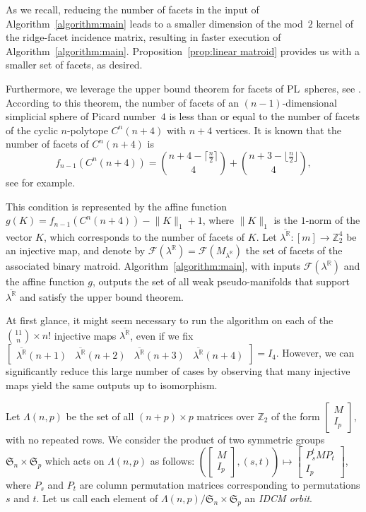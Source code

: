 \documentclass[11pt]{amsart}
\theoremstyle{plain}
\numberwithin{equation}{section}
\theoremstyle{definition}
\newcommand{\cF}{\mathcal{F}}
\newcommand{\R}{\mathbb{R}}
\newcommand{\Z}{\mathbb{Z}}
\begin{document}
As we recall, reducing the number of facets in the input of Algorithm~\ref{algorithm:main} leads to a smaller dimension of the mod~$2$ kernel of the ridge-facet incidence matrix, resulting in faster execution of Algorithm~\ref{algorithm:main}.
Proposition~\ref{prop:linear matroid} provides us with a smaller set of facets, as desired.

Furthermore, we leverage the upper bound theorem for facets of PL~spheres, see \cite{Stanley1996book}.
According to this theorem, the number of facets of an $(n-1)$-dimensional simplicial sphere of Picard number~$4$ is less than or equal to the number of facets of the cyclic $n$-polytope $C^n(n+4)$ with $n+4$ vertices.
It is known that the number of facets of $C^n(n+4)$ is
$$
    f_{n-1} (C^n(n+4)) = \binom{n+4- \lceil \frac{n}{2} \rceil}{4} + \binom{n+3- \lfloor \frac{n}{2} \rfloor}{4},
$$ see \cite{Buchstaber-Panov2015} for example.

This condition is represented by the affine function $g(K)=f_{n-1}(C^n(n+4))-\lVert K \rVert_1 +1$, where $\lVert K \rVert_1$ is the $1$-norm of the vector $K$, which corresponds to the number of facets of $K$.
Let $\overline{\lambda^\R} \colon [m] \longrightarrow \Z_2^4$ be an injective map, and denote by $\cF(\lambda^\R)=\cF(M_{\lambda^\R})$ the set of facets of the associated binary matroid.
Algorithm~\ref{algorithm:main}, with inputs $\cF(\lambda^\R)$ and the affine function $g$, outputs the set of all weak pseudo-manifolds that support $\overline{\lambda^\R}$ and satisfy the upper bound theorem.

At first glance, it might seem necessary to run the algorithm on each of the $\binom{11}{n}\times n!$ injective maps $\overline{\lambda^\R}$, even if we fix $\begin{bmatrix} \overline{\lambda^\R}(n+1) & \overline{\lambda^\R}(n+2) & \overline{\lambda^\R}(n+3) & \overline{\lambda^\R}(n+4) \end{bmatrix} = I_4$.
However, we can significantly reduce this large number of cases by observing that many injective maps yield the same outputs up to isomorphism.

Let $\Lambda(n, p)$ be the set of all $ (n+p) \times p$ matrices over $\Z_2$ of the form $\begin{bmatrix} M \\ I_p \end{bmatrix}$, with no repeated rows.
We consider the product of two symmetric groups $\mathfrak{S}_n \times \mathfrak{S}_p$
which acts on $\Lambda(n, p)$ as follows: $\left(\begin{bmatrix} M \\ I_p \end{bmatrix}, (s, t) \right) \mapsto \begin{bmatrix} P_s^t M P_t \\ I_p \end{bmatrix}$, where $P_s$ and $P_t$ are column permutation matrices corresponding to permutations $s$ and $t$.
Let us call each element of $\Lambda(n, p) / \mathfrak{S}_n \times \mathfrak{S}_p$ an \emph{IDCM orbit}.
\end{document}
